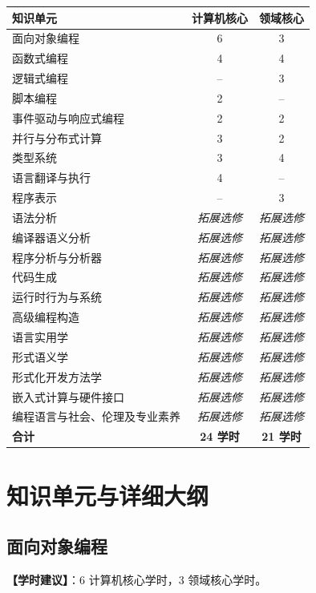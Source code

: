 \begin{table}[H]
\centering
\setlength{\tabcolsep}{3.5pt}\fontsize{8pt}{9.6pt}\selectfont\begin{tabularx}{\columnwidth}{Y c c}
\toprule
\textbf{知识单元} & \textbf{计算机核心} & \textbf{领域核心} \\
\midrule
面向对象编程 & 6 & 3 \\
函数式编程 & 4 & 4 \\
逻辑式编程 & -- & 3 \\
脚本编程 & 2 & -- \\
事件驱动与响应式编程 & 2 & 2 \\
并行与分布式计算 & 3 & 2 \\
类型系统 & 3 & 4 \\
语言翻译与执行 & 4 & -- \\
程序表示 & -- & 3 \\
语法分析 & \emph{拓展选修} & \emph{拓展选修} \\
编译器语义分析 & \emph{拓展选修} & \emph{拓展选修} \\
程序分析与分析器 & \emph{拓展选修} & \emph{拓展选修} \\
代码生成 & \emph{拓展选修} & \emph{拓展选修} \\
运行时行为与系统 & \emph{拓展选修} & \emph{拓展选修} \\
高级编程构造 & \emph{拓展选修} & \emph{拓展选修} \\
语言实用学 & \emph{拓展选修} & \emph{拓展选修} \\
形式语义学 & \emph{拓展选修} & \emph{拓展选修} \\
形式化开发方法学 & \emph{拓展选修} & \emph{拓展选修} \\
嵌入式计算与硬件接口 & \emph{拓展选修} & \emph{拓展选修} \\
编程语言与社会、伦理及专业素养 & \emph{拓展选修} & \emph{拓展选修} \\
\midrule
\textbf{合计} & \textbf{24 学时} & \textbf{21 学时} \\
\bottomrule
\end{tabularx}
\end{table}

\section{知识单元与详细大纲}

\subsection{面向对象编程}
\textbf{【学时建议】}：6 计算机核心学时，3 领域核心学时。

